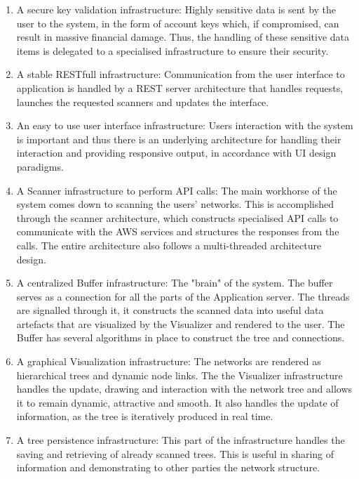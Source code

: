 \documentclass[hidelinks,a4paper,12pt]{article}
\begin{document}
\begin{enumerate} 
\item A secure key validation infrastructure: Highly sensitive data is sent by the user to the system, in the form of account keys which, if compromised, can result in massive financial damage. Thus, the handling of these sensitive data items is delegated to a specialised infrastructure to ensure their security.
\item A stable RESTfull infrastructure: Communication from the user interface to application is handled by a REST server architecture that handles requests, launches the requested scanners and updates the interface.
\item An easy to use user interface infrastructure: Users interaction with the system is important and thus there is an underlying architecture for handling their interaction and providing responsive output, in accordance with UI design paradigms.
\item A Scanner infrastructure to perform API calls: The main workhorse of the system comes down to scanning the users' networks. This is accomplished through the scanner architecture, which constructs specialised API calls to communicate with the AWS services and structures the responses from the calls. The entire architecture also follows a multi-threaded architecture design.
\item A centralized Buffer infrastructure: The "brain" of the system. The buffer serves as a connection for all the parts of the Application server. The threads are signalled through it, it constructs the scanned data into useful data artefacts that are visualized by the Visualizer and rendered to the user. The Buffer has several algorithms in place to construct the tree and connections.
\item A graphical Visualization infrastructure: The networks are rendered as hierarchical trees and dynamic node links. The the Visualizer infrastructure handles the update, drawing and interaction with the network tree and allows it to remain dynamic, attractive and smooth. It also handles the update of information, as the tree is iteratively produced in real time.
\item A tree persistence infrastructure: This part of the infrastructure handles the saving and retrieving of already scanned trees. This is useful in sharing of information and demonstrating to other parties the network structure.
\end{enumerate} 
\end{document}
